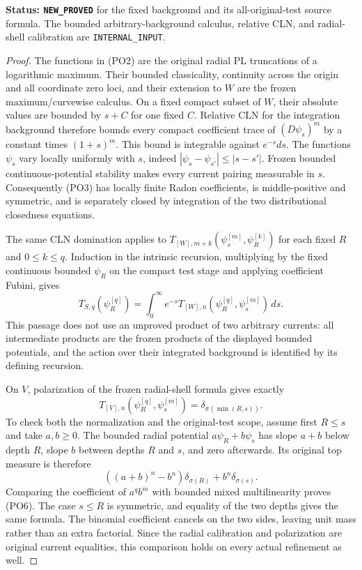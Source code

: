 \documentclass[11pt,a4paper]{article}
\numberwithin{equation}{section}
\theoremstyle{definition}
\theoremstyle{remark}
\begin{document}
\noindent\textbf{Status: \texttt{NEW\_PROVED}} for the
fixed background and its all-original-test source formula.
The bounded arbitrary-background calculus, relative CLN,
and radial-shell calibration are \texttt{INTERNAL\_INPUT}.

\begin{proof}
The functions in \textup{(PO2)} are the original radial
PL truncations of a logarithmic maximum.  Their bounded
classicality, continuity across the origin and all coordinate
zero loci, and their extension to $W$ are the frozen
maximum/curvewise calculus.  On a fixed compact subset
of $W$, their absolute values are bounded by $s+C$ for
one fixed $C$.  Relative CLN for the integration background
therefore bounds every compact coefficient trace of
$(D\psi_s)^m$ by a constant times $(1+s)^m$.
This bound is integrable against $e^{-s}ds$.
The functions $\psi_s$ vary locally uniformly with $s$,
indeed $|\psi_s-\psi_{s'}|\le|s-s'|$.  Frozen bounded
continuous-potential stability makes every current pairing
measurable in $s$.  Consequently \textup{(PO3)} has
locally finite Radon coefficients, is middle-positive and
symmetric, and is separately closed by integration of the
two distributional closedness equations.

The same CLN domination applies to
$T_{[W],m+k}(\psi_s^{[m]},\psi_R^{[k]})$ for each
fixed $R$ and $0\le k\le q$.  Induction in the intrinsic
recursion, multiplying by the fixed continuous bounded
$\psi_R$ on the compact test stage and applying coefficient
Fubini, gives
\[
 T_{S,q}(\psi_R^{[q]})
    =\int_0^\infty e^{-s}
       T_{[W],n}(\psi_R^{[q]},\psi_s^{[m]})\,ds.
 \tag{PO5}
\]
This passage does not use an unproved product of two
arbitrary currents: all intermediate products are the
frozen products of the displayed bounded potentials,
and the action over their integrated background is
identified by its defining recursion.

On $V$, polarization of the frozen radial-shell formula
gives exactly
\[
          T_{[V],n}(\psi_R^{[q]},\psi_s^{[m]})
                                    =\delta_{\sigma(\min(R,s))}.
 \tag{PO6}
\]
To check both the normalization and the original-test
scope, assume first $R\le s$ and take $a,b\ge0$.
The bounded radial potential $a\psi_R+b\psi_s$ has
slope $a+b$ below depth $R$, slope $b$ between depths
$R$ and $s$, and zero afterwards.  Its original top
measure is therefore
\[
       ((a+b)^n-b^n)\delta_{\sigma(R)}
                                      +b^n\delta_{\sigma(s)}.
\]
Comparing the coefficient of $a^qb^m$ with bounded
mixed multilinearity proves \textup{(PO6)}.  The case
$s\le R$ is symmetric, and equality of the two depths
gives the same formula.  The binomial coefficient
cancels on the two sides, leaving unit mass rather
than an extra factorial.  Since the radial calibration
and polarization are original current equalities, this
comparison holds on every actual refinement as well.


\end{proof}
\end{document}
